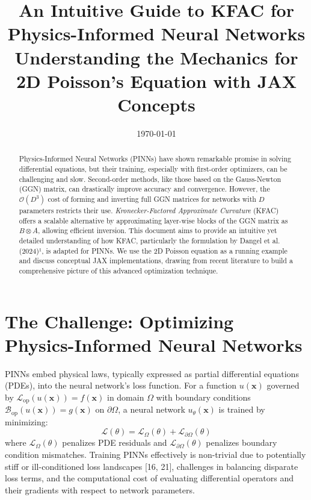 \documentclass[12pt,a4paper]{article}
\title{An Intuitive Guide to KFAC for Physics-Informed Neural Networks\\[-3pt]
       \large Understanding the Mechanics for 2D Poisson's Equation with JAX Concepts}
\date{\today}
\newcommand{\Lop}{\mathcal{L}_{\text{op}}} %
\newcommand{\Bop}{\mathcal{B}_{\text{op}}} %
\newcommand{\kron}{\otimes}
\newcommand{\vect}[1]{\mathbf{#1}} %
\begin{document}
\maketitle

\begin{abstract}
\noindent
Physics-Informed Neural Networks (PINNs) have shown remarkable promise in solving differential equations, but their training, especially with first-order optimizers, can be challenging and slow. Second-order methods, like those based on the Gauss-Newton (GGN) matrix, can drastically improve accuracy and convergence. However, the \(\mathcal{O}(D^3)\) cost of forming and inverting full GGN matrices for networks with \(D\) parameters restricts their use. \emph{Kronecker-Factored Approximate Curvature} (KFAC) offers a scalable alternative by approximating layer-wise blocks of the GGN matrix as \(B \kron A\), allowing efficient inversion. This document aims to provide an intuitive yet detailed understanding of how KFAC, particularly the formulation by Dangel et al.\,(2024)¹, is adapted for PINNs. We use the 2D Poisson equation as a running example and discuss conceptual JAX implementations, drawing from recent literature to build a comprehensive picture of this advanced optimization technique.
\end{abstract}

\section{The Challenge: Optimizing Physics-Informed Neural Networks}
PINNs embed physical laws, typically expressed as partial differential equations (PDEs), into the neural network's loss function. For a function \(u(\vect{x})\) governed by \(\Lop(u(\vect{x})) = f(\vect{x})\) in domain \(\Omega\) with boundary conditions \(\Bop(u(\vect{x})) = g(\vect{x})\) on \(\partial\Omega\), a neural network \(u_\theta(\vect{x})\) is trained by minimizing:
\begin{equation}
\mathcal{L}(\theta) = \mathcal{L}_\Omega(\theta) + \mathcal{L}_{\partial\Omega}(\theta)
\label{eq:generic_pinn_loss}
\end{equation}
where \(\mathcal{L}_\Omega(\theta)\) penalizes PDE residuals and \(\mathcal{L}_{\partial\Omega}(\theta)\) penalizes boundary condition mismatches. Training PINNs effectively is non-trivial due to potentially stiff or ill-conditioned loss landscapes [16, 21], challenges in balancing disparate loss terms, and the computational cost of evaluating differential operators and their gradients with respect to network parameters.
\end{document}
